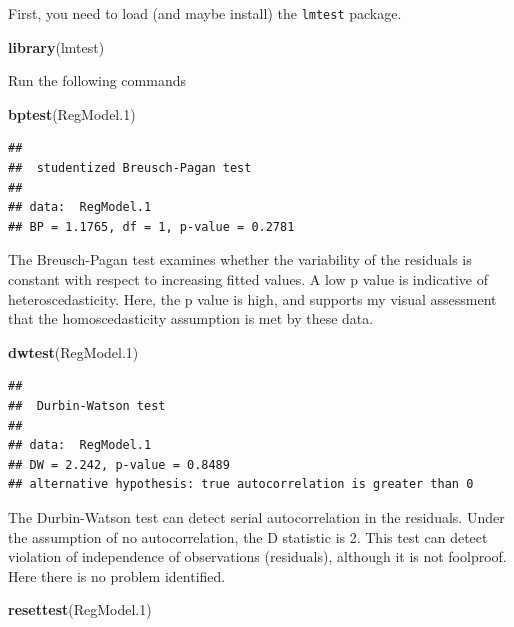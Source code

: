 \documentclass[
  12pt,
]{book}
\makeatletter
\newenvironment{Shaded}{\begin{snugshade}}{\end{snugshade}}
\newcommand{\FloatTok}[1]{\textcolor[rgb]{0.00,0.00,0.81}{#1}}
\newcommand{\KeywordTok}[1]{\textcolor[rgb]{0.13,0.29,0.53}{\textbf{#1}}}
\newcommand{\NormalTok}[1]{#1}
\newenvironment{kframe}{%
\medskip{}
\setlength{\fboxsep}{.8em}
\def\at@end@of@kframe{}%
\ifinner\ifhmode%
 \def\at@end@of@kframe{\end{minipage}}%
 \begin{minipage}{\columnwidth}%
\fi\fi%
\def\FrameCommand##1{\hskip\@totalleftmargin \hskip-\fboxsep
\colorbox{incolor}{##1}\hskip-\fboxsep
    \hskip-\linewidth \hskip-\@totalleftmargin \hskip\columnwidth}%
\MakeFramed {\advance\hsize-\width
  \@totalleftmargin\z@ \linewidth\hsize
  \@setminipage}}%
{\par\unskip\endMakeFramed%
\at@end@of@kframe}
\newenvironment{rmdblock}[1]
 {
 \begin{itemize}
 \renewcommand{\labelitemi}{
   \raisebox{-.7\height}[0pt][0pt]{
     {\setkeys{Gin}{width=3em,keepaspectratio}\texttt{[image: images/\#1]}}
   }
 }
 \begin{kframe}
 \setlength{\fboxsep}{1em}
 \item
 }
 {
 \end{kframe}
 \end{itemize}
 }
\newenvironment{rmdcode}
  {\begin{rmdblock}{screen}}
  {\end{rmdblock}}
\makeatother
\begin{document}
First, you need to load (and maybe install) the \texttt{lmtest} package.

\begin{Shaded}
\begin{Highlighting}[]
\KeywordTok{library}\NormalTok{(lmtest)}
\end{Highlighting}
\end{Shaded}

\begin{rmdcode}
Run the following commands
\end{rmdcode}

\begin{Shaded}
\begin{Highlighting}[]
\KeywordTok{bptest}\NormalTok{(RegModel}\FloatTok{.1}\NormalTok{)}
\end{Highlighting}
\end{Shaded}

\begin{verbatim}
## 
##  studentized Breusch-Pagan test
## 
## data:  RegModel.1
## BP = 1.1765, df = 1, p-value = 0.2781
\end{verbatim}

The Breusch-Pagan test examines whether the variability of the residuals is constant with respect to increasing fitted values. A low p value is indicative of heteroscedasticity. Here, the p value is high, and supports my visual assessment that the homoscedasticity assumption is met by these data.

\begin{Shaded}
\begin{Highlighting}[]
\KeywordTok{dwtest}\NormalTok{(RegModel}\FloatTok{.1}\NormalTok{)}
\end{Highlighting}
\end{Shaded}

\begin{verbatim}
## 
##  Durbin-Watson test
## 
## data:  RegModel.1
## DW = 2.242, p-value = 0.8489
## alternative hypothesis: true autocorrelation is greater than 0
\end{verbatim}

The Durbin-Watson test can detect serial autocorrelation in the residuals. Under the assumption of no autocorrelation, the D statistic is 2. This test can detect violation of independence of observations (residuals), although it is not foolproof. Here there is no problem identified.

\begin{Shaded}
\begin{Highlighting}[]
\KeywordTok{resettest}\NormalTok{(RegModel}\FloatTok{.1}\NormalTok{)}
\end{Highlighting}
\end{Shaded}
\end{document}
